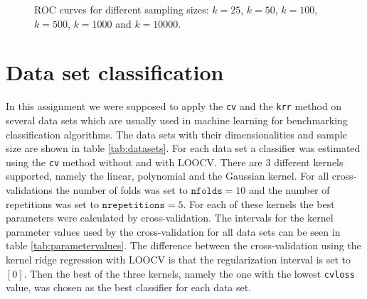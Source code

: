 \documentclass[a4paper, 11pt, titlepage]{article}
\begin{document}
\begin{figure}
	\caption{ROC curves for different sampling sizes: \protect{} $k=25$, \protect{} $k=50$, \protect{} $k=100$, \protect{} $k=500$, \protect{} $k=1000$ and \protect{} $k=10000$.}
	\label{fig:rocCurves}
\end{figure}

\section{Data set classification}

In this assignment we were supposed to apply the \texttt{cv} and the \texttt{krr} method on several data sets which are usually used in machine learning for benchmarking classification algorithms.
The data sets with their dimensionalities and sample size are shown in table \ref{tab:datasets}.
For each data set a classifier was estimated using the \texttt{cv} method without and with LOOCV.
There are $3$ different kernels supported, namely the linear, polynomial and the Gaussian kernel.
For all cross-validations the number of folds was set to $\texttt{nfolds}=10$ and the number of repetitions was set to $\texttt{nrepetitions}=5$.
For each of these kernels the best parameters were calculated by cross-validation.
The intervals for the kernel parameter values used by the cross-validation for all data sets can be seen in table \ref{tab:parametervalues}.
The difference between the cross-validation using the kernel ridge regression with LOOCV is that the regularization interval is set to $[0]$.
Then the best of the three kernels, namely the one with the lowest \texttt{cvloss} value, was chosen as the best classifier for each data set.
\end{document}
